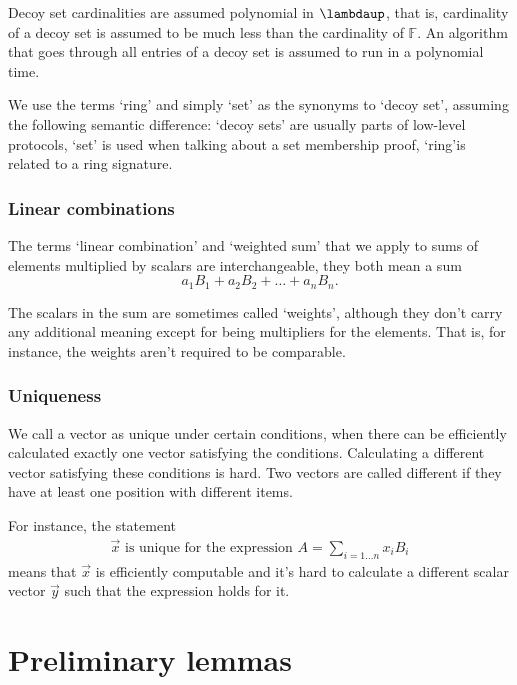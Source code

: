 \documentclass{mathcryptology} %
\theoremstyle{title}
\theoremstyle{titleof}
\begin{document}
    Decoy set cardinalities are assumed polynomial in $\bm{\lambdaup}$, that is, cardinality of a decoy set is assumed to be much less than the cardinality of $\mathds{F}$. An algorithm that goes through all entries of a decoy set is assumed to run in a polynomial time.

    We use the terms `ring' and simply `set' as the synonyms to `decoy set', assuming the following semantic difference: `decoy sets' are usually parts of low-level protocols, `set' is used when talking about a set membership proof, `ring'is related to a ring signature.


\subsubsection{Linear combinations}
    The terms `linear combination' and `weighted sum' that we apply to sums of elements multiplied by scalars are interchangeable, they both mean a sum
    \begin{equation*}
        a_{1} B_{1} + a_{2} B_{2} + {\dots} + a_{n} B_{n}.
    \end{equation*}

    The scalars in the sum are sometimes called `weights', although they don't carry any additional meaning except for being multipliers for the elements. That is, for instance, the weights aren't required to be comparable.


\subsubsection{Uniqueness}
    We call a vector as unique under certain conditions, when there can be efficiently calculated exactly one vector satisfying the conditions. Calculating a different vector satisfying these conditions is hard. Two vectors are called different if they have at least one position with different items.
    
    For instance, the statement
    \begin{align*}
        \vec{x} \text{ is unique for the expression } 
        A=\sum_{i=1\dots{}n} x_iB_i
    \end{align*}
    means that $\vec{x}$ is efficiently computable and it's hard to calculate a different scalar vector $\vec{y}$ such that the expression holds for it.


\section{Preliminary lemmas}
\end{document}
